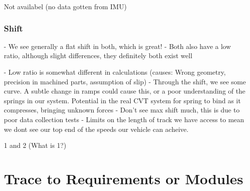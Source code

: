 \documentclass[12pt, titlepage]{article}
\begin{document}
Not availabel (no data gotten from IMU)

\subsubsection{Shift}

- We see generally a flat shift in both, which is great!
- Both also have a low ratio, although slight differences, they definitely both exist well

- Low ratio is somewhat different in calculations (causes: Wrong geometry, precision in machined parts, assumption of slip)
- Through the shift, we see some curve. A subtle change in ramps could cause this, or a poor understanding of the springs in our system. Potential in the real CVT system for spring to bind as it compresses, bringing unknown forces
- Don't see max shift much, this is due to poor data collection tests - Limits on the length of track we have access to mean we dont see our top end of the speeds our vehicle can acheive.


1 and 2 (What is 1?)

\section{Trace to Requirements or Modules}
\end{document}
